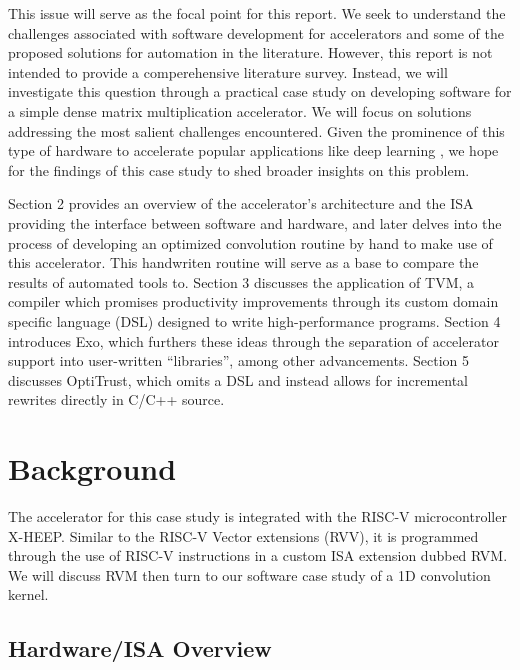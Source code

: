 \documentclass[acmsmall, nonacm=true]{acmart}
\begin{document}
This issue will serve as the focal point for this report. We seek to understand the challenges associated with software development for accelerators and some of the proposed solutions for automation in the literature. However, this report is not intended to provide a comperehensive literature survey. Instead, we will investigate this question through a practical case study on developing software for a simple dense matrix multiplication accelerator. We will focus on solutions addressing the most salient challenges encountered. Given the prominence of this type of hardware to accelerate popular applications like deep learning \cite{gemmini,tpuv1,sme,tensorcore,mma}, we hope for the findings of this case study to shed broader insights on this problem.
    
Section 2 provides an overview of the accelerator's architecture and the ISA providing the interface between software and hardware, and later delves into the process of developing an optimized convolution routine by hand to make use of this accelerator. This handwriten routine will serve as a base to compare the results of automated tools to. Section 3 discusses the application of TVM, a compiler which promises productivity improvements through its custom domain specific language (DSL) designed to write high-performance programs. Section 4 introduces Exo, which furthers these ideas through the separation of accelerator support into user-written ``libraries'', among other advancements. Section 5 discusses OptiTrust, which omits a DSL and instead allows for incremental rewrites directly in C/C++ source.  

\section{Background}

The accelerator for this case study is integrated with the RISC-V microcontroller X-HEEP\cite{x_heep}. Similar to the RISC-V Vector extensions (RVV), it is programmed through the use of RISC-V instructions in a custom ISA extension dubbed RVM. We will discuss RVM then turn to our software case study of a 1D convolution kernel.

\subsection{Hardware/ISA Overview}
\end{document}
